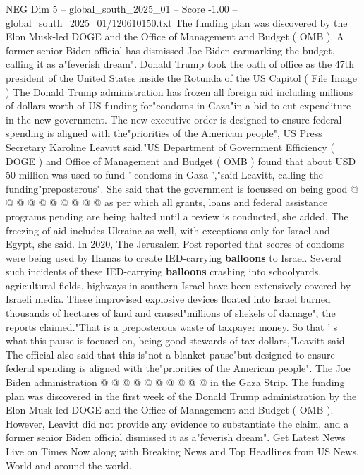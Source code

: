 \begin{textsample}{NEG Dim 5 – global\_south\_2025\_01 – Score -1.00 – global\_south\_2025\_01/120610150.txt}  \label{ex:f5_neg_100}
The funding plan was discovered by the Elon Musk-led DOGE and the Office of Management and Budget ( OMB ).
A former senior Biden official has dismissed Joe Biden earmarking the budget, calling it as a"feverish dream".
Donald Trump took the oath of office as the 47th president of the United States inside the Rotunda of the US Capitol ( File Image ) The Donald Trump administration has frozen all foreign aid including millions of dollars-worth of US funding for"condoms in Gaza"in a bid to cut expenditure in the new government.
The new executive order is designed to ensure federal spending is aligned with the"priorities of the American people", US Press Secretary Karoline Leavitt said."US Department of Government Efficiency ( DOGE ) and Office of Management and Budget ( OMB ) found that about USD 50 million was used to fund ' condoms in Gaza ',"said Leavitt, calling the funding"preposterous".
She said that the government is focussed on being good @ @ @ @ @ @ @ @ @ @ as per which all grants, loans and federal assistance programs pending are being halted until a review is conducted, she added.
The freezing of aid includes Ukraine as well, with exceptions only for Israel and Egypt, she said.
In 2020, The Jerusalem Post reported that scores of condoms were being used by Hamas to create IED-carrying \textbf{balloons} to Israel.
Several such incidents of these IED-carrying \textbf{balloons} crashing into schoolyards, agricultural fields, highways in southern Israel have been extensively covered by Israeli media.
These improvised explosive devices floated into Israel burned thousands of hectares of land and caused"millions of shekels of damage", the reports claimed."That is a preposterous waste of taxpayer money.
So that ' s what this pause is focused on, being good stewards of tax dollars,"Leavitt said.
The official also said that this is"not a blanket pause"but designed to ensure federal spending is aligned with the"priorities of the American people".
The Joe Biden administration @ @ @ @ @ @ @ @ @ @ in the Gaza Strip.
The funding plan was discovered in the first week of the Donald Trump administration by the Elon Musk-led DOGE and the Office of Management and Budget ( OMB ).
However, Leavitt did not provide any evidence to substantiate the claim, and a former senior Biden official dismissed it as a"feverish dream".
Get Latest News Live on Times Now along with Breaking News and Top Headlines from US News, World and around the world.

\end{textsample}
